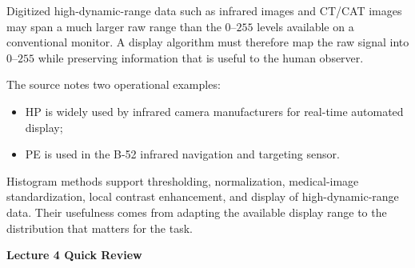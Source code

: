 \documentclass[11pt,a4paper,oneside]{report}
\begin{document}
Digitized high-dynamic-range data such as infrared images and CT/CAT images may span a much larger raw range than the $0$--$255$ levels available on a conventional monitor. A display algorithm must therefore map the raw signal into $0$--$255$ while preserving information that is useful to the human observer.

The source notes two operational examples:
\begin{itemize}
  \item HP is widely used by infrared camera manufacturers for real-time automated display;
  \item PE is used in the B-52 infrared navigation and targeting sensor.
\end{itemize}

\FloatBarrier
\begin{chaptersummary}
Histogram methods support thresholding, normalization, medical-image standardization, local contrast enhancement, and display of high-dynamic-range data. Their usefulness comes from adapting the available display range to the distribution that matters for the task.
\end{chaptersummary}

\clearpage
{}
{}
\begin{center}
{\sffamily\fontsize{22}{26}\selectfont\bfseries\color{Ink}Lecture 4 Quick Review\par}
\vspace{0.35em}{\color{SapienzaRed}\rule{0.82\textwidth}{0.8pt}}
\end{center}
\end{document}
